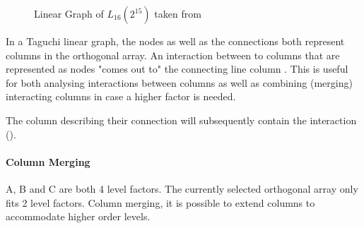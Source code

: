 \begin{figure}[H]
	\label{figure:hyperparameter_tuning:linear_graph}
	\centering
{}
\caption{ Linear Graph of $L_{16}(2^{15})$ taken from \cite{yang_design_2009}}
\end{figure}

In a Taguchi linear graph, the nodes as well as the connections both represent columns in the orthogonal array. An interaction between to columns that are represented as nodes "comes out to" the connecting line column \cite{taguchi_taguchis_2005}. This is useful for both analysing interactions between columns as well as combining (merging) interacting columns in case a higher factor is needed.

The column describing their connection will subsequently contain the interaction (\cite{taguchi_taguchis_2005}).

\paragraph{Column Merging}
A, B and C are both 4 level factors. The currently selected orthogonal array only fits 2 level factors. Column merging, it is possible to extend columns to accommodate higher order levels. 

